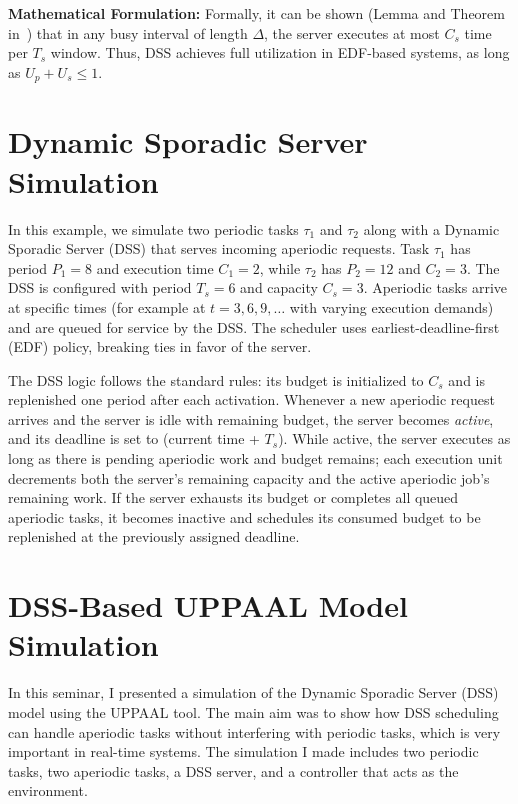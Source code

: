 \documentclass[conference]{IEEEtran}
\begin{document}
\textbf{Mathematical Formulation:} Formally, it can be shown (Lemma and Theorem in~\cite{spuri1994efficient}) that in any busy interval of length $\Delta$, the server executes at most $C_s$ time per $T_s$ window. 
Thus, DSS achieves full utilization in EDF-based systems, as long as $U_p + U_s \leq 1$.

\section{Dynamic Sporadic Server Simulation}
\label{sec:dss_Simulation}In this example, we simulate two periodic tasks $\tau_1$ and $\tau_2$ along with a Dynamic Sporadic Server (DSS) that serves incoming aperiodic requests. Task $\tau_1$ has period $P_1=8$ and execution time $C_1=2$, while $\tau_2$ has $P_2=12$ and $C_2=3$. The DSS is configured with period $T_s=6$ and capacity $C_s=3$. Aperiodic tasks arrive at specific times (for example at $t=3,6,9,\dots$ with varying execution demands) and are queued for service by the DSS. The scheduler uses earliest-deadline-first (EDF) policy, breaking ties in favor of the server\cite{buttazzo2011hard, cpen432}.


The DSS logic follows the standard rules: its budget is initialized to $C_s$ and is replenished one period after each activation\cite{cpen432}. Whenever a new aperiodic request arrives and the server is idle with remaining budget, the server becomes \emph{active}, and its deadline is set to (current time + $T_s$)\cite{cpen432}. While active, the server executes as long as there is pending aperiodic work and budget remains; each execution unit decrements both the server’s remaining capacity and the active aperiodic job’s remaining work. If the server exhausts its budget or completes all queued aperiodic tasks, it becomes inactive and schedules its consumed budget to be replenished at the previously assigned deadline\cite{buttazzo2011hard, cpen432}.


\section{DSS-Based UPPAAL Model Simulation}

In this seminar, I presented a simulation of the Dynamic Sporadic Server (DSS) model using the UPPAAL tool. The main aim was to show how DSS scheduling can handle aperiodic tasks without interfering with periodic tasks, which is very important in real-time systems. The simulation I made includes two periodic tasks, two aperiodic tasks, a DSS server, and a controller that acts as the environment.
\end{document}

